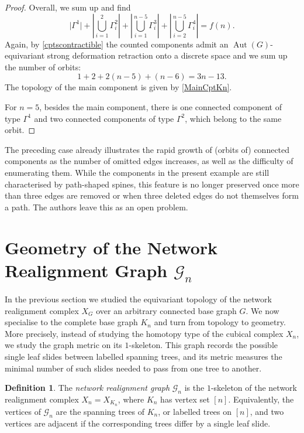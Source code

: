 \documentclass[reqno,dvipsnames]{amsart}
\theoremstyle{plain}
\numberwithin{equation}{section}
\theoremstyle{definition}
\newtheorem{definition}[theorem]{Definition}
\DeclareMathOperator{\Aut}{Aut}
\begin{document}
\begin{proof}
	Overall, we sum up and find
	\begin{equation*}
		\vert\Gamma^1\vert + \left\vert\bigcup\limits_{i=1}^2\Gamma_i^2\right\vert + \left\vert\bigcup\limits_{i=1}^{n-5}\Gamma_i^3\right\vert + \left\vert\bigcup\limits_{i=2}^{n-5}\Gamma_i^4\right\vert = f(n).
	\end{equation*} 
	Again, by \autoref{cptscontractible} the counted components admit an $\Aut(G)$-equivariant strong deformation retraction onto a discrete space and we sum up the number of orbits:
	\begin{equation*}
		1+2+2(n-5)+(n-6) =  3n-13.
	\end{equation*}
	The topology of the main component is given by \autoref{MainCptKn}.
	
	For $n = 5$, besides the main component, there is one connected component of type $\Gamma^1$ and two connected components of type $\Gamma^2$, which belong to the same orbit.
\end{proof}


The preceding case already illustrates the rapid growth of (orbits of) connected components as the number of omitted edges increases, as well as the difficulty of enumerating them. While the components in the present example are still characterised by path-shaped spines, this feature is no longer preserved once more than three edges are removed or when three deleted edges do not themselves form a path. The authors leave this as an open problem.




\section{Geometry of the Network Realignment Graph \texorpdfstring{$\mathcal{G}_n$}{Gn}} \label{sec:Geometry}

In the previous section we studied the equivariant topology of the network realignment complex $X_G$ over an arbitrary connected base graph $G$. We now specialise to the complete base graph $K_n$ and turn from topology to geometry. More precisely, instead of studying the homotopy type of the cubical complex $X_n$, we study the graph metric on its $1$-skeleton. This graph records the possible single leaf slides between labelled spanning trees, and its metric measures the minimal number of such slides needed to pass from one tree to another.

\begin{definition}
	The \textit{network realignment graph} $\mathcal{G}_n$ is the $1$-skeleton of the network realignment complex $X_n=X_{K_n}$, where $K_n$ has vertex set $[n]$. Equivalently, the vertices of $\mathcal{G}_n$ are the spanning trees of $K_n$, or labelled trees on $[n]$, and two vertices are adjacent if the corresponding trees differ by a single leaf slide.
\end{definition}
\end{document}
